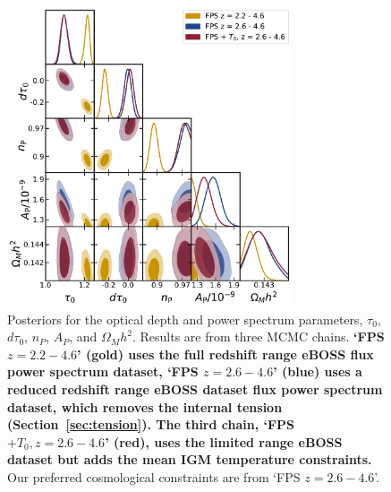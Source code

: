 \begin{figure}
    \centering
    \includegraphics[width=0.75\textwidth]{figures/cosmo_corner.pdf}
    \caption{\label{fig:cosmo_corner}
    Posteriors for the optical depth and power spectrum parameters, $\tau_0$, $d\tau_0$, $n_P$, $A_P$, and $\Omega_M h^2$.
    Results are from three MCMC chains.
    \textbf{`FPS $z=2.2-4.6$' (gold) uses the full redshift range eBOSS flux power spectrum dataset, `FPS $z=2.6-4.6$' (blue) uses a reduced redshift range eBOSS dataset flux power spectrum dataset, which removes the internal tension (Section~\protect\ref{sec:tension}).
    The third chain, `FPS $+ T_0, z=2.6-4.6$' (red), uses the limited range eBOSS dataset but adds the mean IGM temperature constraints.}
    Our preferred cosmological constraints are from `FPS $z=2.6-4.6$'.
    }
\end{figure}

